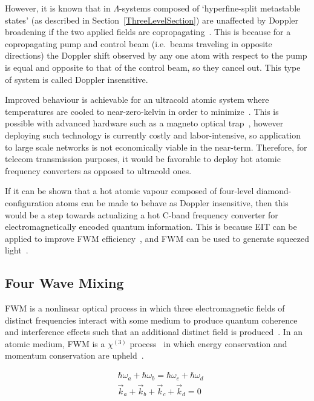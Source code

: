\documentclass[aps,pra,showpacs,amsmath,amssymb,nofootinbib,longbibliography,superscriptaddress
]{revtex4-1}
\theoremstyle{definition}
\theoremstyle{remark}
\newcommand{\0}{\hat{0}}
\begin{document}
However, it is known that in $\Lambda$-systems composed of `hyperfine-split metastable states' (as described in Section~\ref{ThreeLevelSection}) are unaffected by Doppler broadening if the two applied fields are copropagating~\cite{Fleischhauer}. This is because for a copropagating pump and control beam (i.e.~beams traveling in opposite directions) the Doppler shift observed by any one atom with respect to the pump is equal and opposite to that of the control beam, so they cancel out. This type of system is called Doppler insensitive.

Improved behaviour is achievable for an ultracold atomic system where temperatures are cooled to near-zero-kelvin in order to minimize~\cite{Fleischhauer}. This is possible with advanced hardware such as a magneto optical trap~\cite{Geng}, however deploying such technology is currently costly and labor-intensive, so application to large scale networks is not economically viable in the near-term. Therefore, for telecom transmission purposes, it would be favorable to deploy hot atomic frequency converters as opposed to ultracold ones.

If it can be shown that a hot atomic vapour composed of four-level diamond-configuration atoms can be made to behave as Doppler insensitive, then this would be a step towards actualizing a hot C-band frequency converter for electromagnetically encoded quantum information. This is because EIT can be applied to improve FWM efficiency~\cite{Xiao}, and FWM can be used to generate squeezed light~\cite{Slusher}.

\subsection{Four Wave Mixing}

FWM is a nonlinear optical process in which three electromagnetic fields of distinct frequencies interact with some medium to produce quantum coherence and interference effects such that an additional distinct field is produced~\cite{Glorieux}. In an atomic medium, FWM is a $\chi^{(3)}$ process~\cite{Patel} in which energy conservation and momentum conservation are upheld~\cite{QuantumInternet}.

\begin{align}
    &\hbar \omega_a + \hbar \omega_b = \hbar \omega_c + \hbar \omega_d \label{ConservationEq1}\\
    &\vec{k}_a + \vec{k}_b + \vec{k}_c + \vec{k}_d = 0 \label{ConservationEq2}
\end{align}
\end{document}
